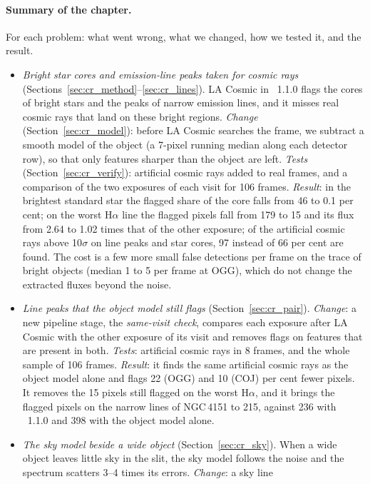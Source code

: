 \paragraph{Summary of the chapter.} For each problem: what went wrong, what we changed, how we tested it, and the result.
\begin{itemize}
\item \textit{Bright star cores and emission-line peaks taken for cosmic rays}
(Sections~\ref{sec:cr_method}--\ref{sec:cr_lines}). LA Cosmic in \banzai{}~1.1.0 flags the cores of bright stars and
the peaks of narrow emission lines, and it misses real cosmic rays that land on these bright regions.
\textit{Change} (Section~\ref{sec:cr_model}): before LA Cosmic searches the frame, we subtract a smooth model of the
object (a 7-pixel running median along each detector row), so that only features sharper than the object are left.
\textit{Tests} (Section~\ref{sec:cr_verify}): artificial cosmic rays added to real frames, and a comparison of the two
exposures of each visit for 106 frames. \textit{Result}: in the brightest standard star the flagged share of the core
falls from 46 to 0.1 per cent; on the worst H$\alpha$ line the flagged pixels fall from 179 to 15 and its flux from
2.64 to 1.02 times that of the other exposure; of the artificial cosmic rays above 10$\sigma$ on line peaks and star
cores, 97 instead of 66 per cent are found. The cost is a few more small false detections per frame on the trace of
bright objects (median 1 to 5 per frame at OGG), which do not change the extracted fluxes beyond the noise.
\item \textit{Line peaks that the object model still flags} (Section~\ref{sec:cr_pair}). \textit{Change}: a new
pipeline stage, the \textit{same-visit check}, compares each exposure after LA Cosmic with the other exposure of its
visit and removes flags on features that are present in both. \textit{Tests}: artificial cosmic rays in 8 frames, and
the whole sample of 106 frames. \textit{Result}: it finds the same artificial cosmic rays as the object model alone and
flags 22 (OGG) and 10 (COJ) per cent fewer pixels. It removes the 15 pixels still flagged on the worst H$\alpha$, and
it brings the flagged pixels on the narrow lines of NGC\,4151 to 215, against 236 with \banzai{}~1.1.0 and 398 with
the object model alone.
\item \textit{The sky model beside a wide object} (Section~\ref{sec:cr_sky}). When a wide object leaves little sky in
the slit, the sky model follows the noise and the spectrum scatters 3--4 times its errors. \textit{Change}: a sky line

\end{itemize}
